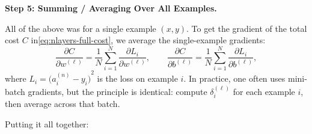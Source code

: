 \documentclass{article}
\begin{document}
\vspace{0.5em}
\noindent \textbf{Step 5: Summing / Averaging Over All Examples.}

All of the above was for a single example \((x,y)\).  To get the gradient of the total cost \(C\) in\eqref{eq:nlayers-full-cost}, we average the single-example gradients:
\[
    \frac{\partial C}{\partial w^{(\ell)}} 
    = \frac{1}{N} \sum_{i=1}^N 
      \frac{\partial L_i}{\partial w^{(\ell)}}, 
    \qquad
    \frac{\partial C}{\partial b^{(\ell)}} 
    = \frac{1}{N} \sum_{i=1}^N 
      \frac{\partial L_i}{\partial b^{(\ell)}},
\]
where \(L_i = {\bigl(a_i^{(n)} - y_i\bigr)}^2\) is the loss on example \(i\).  In practice, one often uses mini-batch gradients, but the principle is identical: compute \(\delta_i^{(\ell)}\) for each example \(i\), then average across that batch.

\vspace{0.5em}
\noindent Putting it all together:
\end{document}
